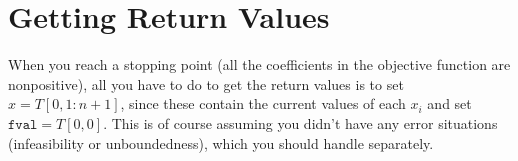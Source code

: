 \section*{Getting Return Values}

When you reach a stopping point (all the coefficients in the objective function are nonpositive), all you have to do to get the return values is to set $x = T[0,1:n+1]$, since these contain the current values of each $x_i$ and set $\mathtt{fval} = T[0,0]$.
This is of course assuming you didn't have any error situations (infeasibility or unboundedness), which you should handle separately.

